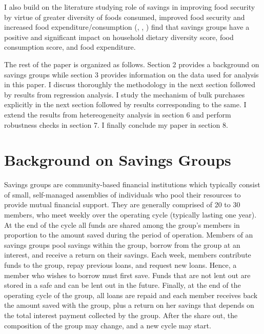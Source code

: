 \documentclass[12pt]{article}
\begin{document}
{\hspace{1cm} I also build on the literature studying role of savings in improving food security by virtue of greater diversity of foods consumed, improved food security and increased food expenditure/consumption (\cite{bass}, \cite{Kiiza}, \cite{beaman}) find that savings groups have a positive and significant impact on household dietary diversity score, food consumption score, and food expenditure. 

\hspace{1cm} The rest of the paper is organized as follows. Section 2 provides a background on savings groups while section 3 provides information on the data used for analysis in this paper. I discuss thoroughly the methodology in the next section followed by results from regression analysis. I study the mechanism of bulk purchases explicitly in the next section followed by results corresponding to the same. I extend the results from hetereogeneity analysis in section 6  and perform robustness checks in section 7. I finally conclude my paper in section 8.


\section{Background on Savings Groups}\label{sec:background}
\hspace{1cm} Savings groups are community-based financial institutions which typically consist of small, self-managed assemblies of individuals who pool their resources to provide mutual financial support. They are generally comprised of 20 to 30 members, who meet weekly over the operating cycle (typically lasting one year). At the end of the cycle all funds are shared among the group’s members in  proportion to the amount saved during the period of operation. Members of an savings groups pool savings within the group, borrow from the group at an interest, and receive a return on their savings. Each week, members contribute funds to the group, repay previous loans, and request new loans. Hence, a member who wishes to borrow must first save. Funds that are not lent out are stored in a safe and can be lent out in the future. Finally, at the end of the operating cycle of the group, all loans are repaid and each member receives back the amount saved with the group, plus a return on her savings that depends on the total interest payment collected by the group. After the share out, the composition of the group may change, and a new cycle may start.

}
\end{document}
